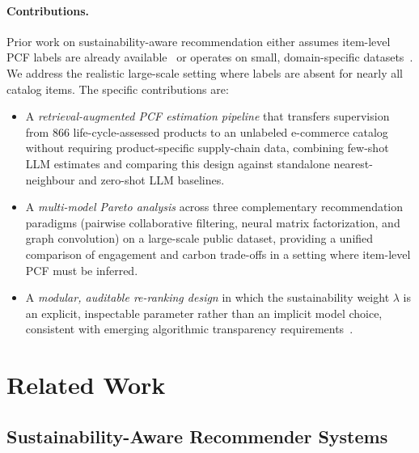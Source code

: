 \documentclass[11pt]{article}
\begin{document}
\paragraph{Contributions.}
Prior work on sustainability-aware recommendation either assumes item-level PCF labels are
already available~\cite{spillo2023sustainabilityaware, kalisvaart2025greenerrec} or operates
on small, domain-specific datasets~\cite{vicenti2026pcfllm, ecoa2026}. We address the
realistic large-scale setting where labels are absent for nearly all catalog items. The
specific contributions are:
\begin{itemize}
  \item A \emph{retrieval-augmented PCF estimation pipeline} that transfers
    supervision from 866 life-cycle-assessed products to an unlabeled e-commerce catalog
    without requiring product-specific supply-chain data, combining few-shot LLM estimates and comparing this design against standalone
    nearest-neighbour and zero-shot LLM baselines.
  \item A \emph{multi-model Pareto analysis} across three complementary recommendation
    paradigms (pairwise collaborative filtering, neural matrix factorization, and graph
    convolution) on a large-scale public dataset, providing a unified comparison of
    engagement and carbon trade-offs in a setting where item-level PCF must be inferred.
  \item A \emph{modular, auditable re-ranking design} in which the sustainability weight
    $\lambda$ is an explicit, inspectable parameter rather than an implicit model choice,
    consistent with emerging algorithmic transparency requirements~\cite{dsa2022}.
\end{itemize}


\section{Related Work}
\label{sec:related}

\subsection{Sustainability-Aware Recommender Systems}
\end{document}
